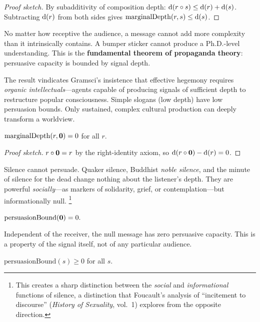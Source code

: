 \begin{proof}[Proof sketch]
By subadditivity of composition depth: $\operatorname{d}(r\circ s)\le \operatorname{d}(r)+\operatorname{d}(s)$.
Subtracting $\operatorname{d}(r)$ from both sides gives $\mathrm{marginalDepth}(r,s)\le\operatorname{d}(s)$.
\end{proof}

No matter how receptive the audience, a message cannot add more complexity
than it intrinsically contains.  A bumper sticker cannot produce a
Ph.D.-level understanding.  This is the \textbf{fundamental theorem of
propaganda theory}: persuasive capacity is bounded by signal depth.

The result vindicates Gramsci's insistence that effective hegemony requires
\emph{organic intellectuals}---agents capable of producing signals of
sufficient depth to restructure popular consciousness.  Simple slogans
(low depth) have low persuasion bounds.  Only sustained, complex cultural
production can deeply transform a worldview.

\begin{theorem}
\label{thm:void-marginal-depth}
$\mathrm{marginalDepth}(r, \mathbf{0}) = 0$ for all $r$.
\end{theorem}

\begin{proof}[Proof sketch]
$r\circ\mathbf{0} = r$ by the right-identity axiom, so $\operatorname{d}(r\circ\mathbf{0})
- \operatorname{d}(r) = 0$.
\end{proof}

Silence cannot persuade.  Quaker silence, Buddhist \emph{noble silence}, and
the minute of silence for the dead change nothing about the listener's
depth.  They are powerful \emph{socially}---as markers of solidarity, grief,
or contemplation---but informationally null.%
\footnote{This creates a sharp distinction between the \emph{social} and
\emph{informational} functions of silence, a distinction that Foucault's
analysis of ``incitement to discourse'' (\textit{History of Sexuality},
vol.~1) explores from the opposite direction.}

\begin{theorem}
\label{thm:void-persuasion-bound}
$\mathrm{persuasionBound}(\mathbf{0}) = 0.$
\end{theorem}

Independent of the receiver, the null message has zero persuasive capacity.
This is a property of the signal itself, not of any particular audience.

\begin{theorem}
\label{thm:persuasion-nonneg}
$\mathrm{persuasionBound}(s) \ge 0$ for all $s$.
\end{theorem}

